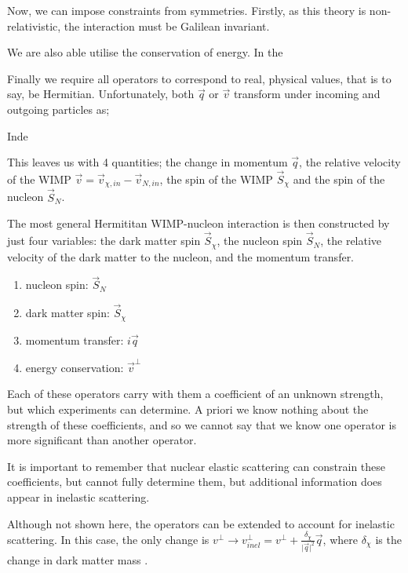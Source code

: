 \par
Now, we can impose constraints from symmetries.
Firstly, as this theory is non-relativistic, the interaction must be Galilean invariant.



\par
We are also able utilise the conservation of energy.
In the 

\par
Finally we require all operators to correspond to real, physical values, that is to say, be Hermitian.
Unfortunately, both $\vec{q}$ or $\vec{v}$ transform under incoming and outgoing particles as;


\par
Inde

This leaves us with 4 quantities; the change in momentum $\vec{q}$, the relative velocity of the WIMP $\vec{v}=\vec{v}_{\chi,in} - \vec{v}_{N,in}$, the spin of the WIMP $\vec{S}_{\chi}$ and the spin of the nucleon $\vec{S}_{N}$.


\par
The most general Hermititan WIMP-nucleon interaction is then constructed by just four variables: the dark matter spin $\Vec{S}_{\chi}$, the nucleon spin $\Vec{S}_{N}$, the relative velocity of the dark matter to the nucleon, and the momentum transfer.
\begin{enumerate}
    \item nucleon spin: $\Vec{S}_{N}$
    \item dark matter spin: $\Vec{S}_{\chi}$
    \item momentum transfer: $i\Vec{q}$
    \item energy conservation: $\Vec{v}^{\bot}$
\end{enumerate}
\par
Each of these operators carry with them a coefficient of an unknown strength, but which experiments can determine.
A priori we know nothing about the strength of these coefficients, and so we cannot say that we know one operator is more significant than another operator.

\par
It is important to remember that nuclear elastic scattering can constrain these coefficients, but cannot fully determine them, but additional information does appear in inelastic scattering.





\par
Although not shown here, the operators can be extended to account for inelastic scattering.
In this case, the only change is $v^{\perp} \rightarrow v_{inel}^{\perp}=v^{\perp} + \frac{\delta_\chi}{\vert\vec{q}\vert^2}\vec{q}$, where $\delta_\chi$ is the change in dark matter mass \cite{inelastics_eft_ref}.


